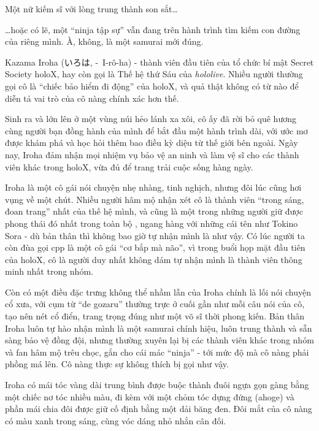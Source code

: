 \documentclass[../main.tex]{subfiles}
\begin{document}
Một nữ kiếm sĩ với lòng trung thành son sắt\dots

\dots hoặc có lẽ, một ``ninja tập sự'' vẫn đang trên hành trình tìm kiếm con đường của riêng mình. À, không, là một samurai mới đúng.

\chrint

Kazama Iroha (いろは, -\ I-rô-ha) - thành viên đầu tiên của tổ chức bí mật Secret Society holoX, hay còn gọi là Thế hệ thứ Sáu của \textit{hololive}. Nhiều người thường gọi cô là ``chiếc bảo hiểm đi động'' của holoX, và quả thật không có từ nào để diễn tả vai trò của cô nàng chính xác hơn thế.

Sinh ra và lớn lên ở một vùng núi hẻo lánh xa xôi, cô ấy đã rời bỏ quê hương cùng người bạn đồng hành của mình để bắt đầu một hành trình dài, với ước mơ được khám phá và học hỏi thêm bao điều kỳ diệu từ thế giới bên ngoài. Ngày nay, Iroha đảm nhận mọi nhiệm vụ bảo vệ an ninh và làm vệ sĩ cho các thành viên khác trong holoX, vừa đủ để trang trải cuộc sống hàng ngày.

Iroha là một cô gái nói chuyện nhẹ nhàng, tinh nghịch, nhưng đôi lúc cũng hơi vụng về một chút. Nhiều người hâm mộ nhận xét cô là thành viên ``trong sáng, đoan trang'' nhất của thế hệ mình, và cũng là một trong những người giữ được phong thái đó nhất trong toàn bộ \hll, ngang hàng với những cái tên như Tokino Sora - dù bản thân thì không bao giờ tự nhận mình là như vậy. Có lúc người ta còn đùa gọi cpp là một cô gái ``cơ bắp mà não'', vì trong buổi họp mặt đầu tiên của holoX, cô là người duy nhất không dám tự nhận mình là thành viên thông minh nhất trong nhóm.


Còn có một điều đặc trưng không thể nhầm lẫn của Iroha chính là lối nói chuyện cổ xưa, với cụm từ ``de gozaru'' thường trực ở cuối gần như mỗi câu nói của cô, tạo nên nét cổ điển, trang trọng đúng như một võ sĩ thời phong kiến. Bản thân Iroha luôn tự hào nhận mình là một samurai chính hiệu, luôn trung thành và sẵn sàng bảo vệ đồng đội, nhưng thường xuyên lại bị các thành viên khác trong nhóm và fan hâm mộ trêu chọc, gắn cho cái mác ``ninja'' - tới mức độ mà cô nàng phải phồng má lên. Cô nàng thực sự không thích bị gọi như vậy.

Iroha có mái tóc vàng dài trung bình được buộc thành đuôi ngựa gọn gàng bằng một chiếc nơ tóc nhiều màu, đi kèm với một chỏm tóc dựng đứng (ahoge) và phần mái chia đôi được giữ cố định bằng một dải băng đen. Đôi mắt của cô nàng có màu xanh trong sáng, cùng vóc dáng nhỏ nhắn cân đối.
\end{document}

